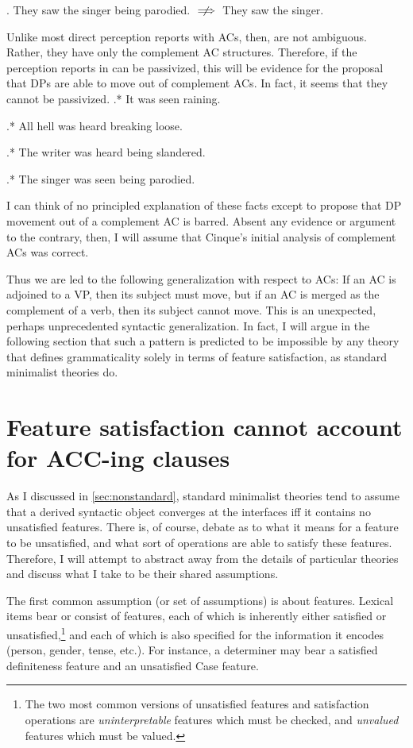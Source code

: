 \documentclass[MilwayThesis]{subfiles}
\begin{document}
\ex. They saw the singer being parodied. $\centernot\implies$ They saw the singer. \label{ex:ACCingParody}

Unlike most direct perception reports with ACs, then,  are not ambiguous.
Rather, they have only the complement AC structures.
Therefore, if the perception reports in  can be passivized, this will be evidence for the proposal that DPs are able to move out of complement ACs.
In fact, it seems that they cannot be passivized.
\ex.* It was seen raining.

\ex.* All hell was heard breaking loose.

\ex.* The writer was heard being slandered.\label{ex:SlanderedPassive}

\ex.* The singer was seen being parodied.\label{ex:ParodiedPassive}

I can think of no principled explanation of these facts except to propose that DP movement out of a complement AC is barred.
Absent any evidence or argument to the contrary, then, I will assume that Cinque's initial analysis of complement ACs was correct.

Thus we are led to the following generalization with respect to ACs:
If an AC is adjoined to a VP, then its subject must move, but if an AC is merged as the complement of a verb, then its subject cannot move.
This is an unexpected, perhaps unprecedented syntactic generalization.
In fact, I will argue in the following section that such a pattern is predicted to be impossible by any theory that defines grammaticality solely in terms of feature satisfaction, as standard minimalist theories do.
\section{Feature satisfaction cannot account for ACC-ing clauses}\label{sec:paradox}
As I discussed in \cref{sec:nonstandard}, standard minimalist theories tend to assume that a derived syntactic object converges at the interfaces iff it contains no unsatisfied features.
There is, of course, debate as to what it means for a feature to be unsatisfied, and what sort of operations are able to satisfy these features.
Therefore, I will attempt to abstract away from the details of particular theories and discuss what I take to be their shared assumptions.

The first common assumption (or set of assumptions) is about features.
Lexical items bear or consist of features, each of which is inherently either satisfied or unsatisfied,\footnote{
	The two most common versions of unsatisfied features and satisfaction operations are \textit{uninterpretable} features which must be checked, and \textit{unvalued} features which must be valued.
}
 and each of which is also specified for the information it encodes (person, gender, tense, etc.).
For instance, a determiner may bear a satisfied definiteness feature and an unsatisfied Case feature.
\end{document}

